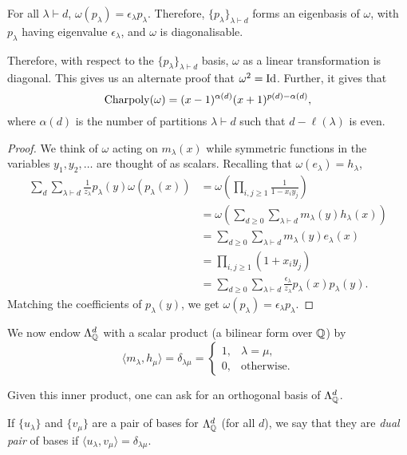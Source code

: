 	\begin{ftheo}
		\label{theo: p eigenbasis of omega}
		For all $\lambda \vdash d$, $\omega(p_\lambda) = \epsilon_\lambda p_\lambda$. Therefore, $\{p_\lambda\}_{\lambda \vdash d}$ forms an eigenbasis of $\omega$, with $p_\lambda$ having eigenvalue $\epsilon_\lambda$, and $\omega$ is diagonalisable.
	\end{ftheo}
	Therefore, with respect to the $\{p_\lambda\}_{\lambda \vdash d}$ basis, $\omega$ as a linear transformation is diagonal. This gives us an alternate proof that $\omega^2 = \operatorname{Id}$. Further, it gives that
	\[ \operatorname{Charpoly}(\omega) = (x-1)^{\alpha(d)} (x+1)^{p(d) - \alpha(d)}, \]
	where $\alpha(d)$ is the number of partitions $\lambda \vdash d$ such that $d - \ell(\lambda)$ is even.
	\begin{proof}
		We think of $\omega$ acting on $m_\lambda(x)$ while symmetric functions in the variables $y_1,y_2,\ldots$ are thought of as scalars. Recalling that $\omega(e_\lambda) = h_\lambda$,
		\begin{align*}
			\sum_{d}\sum_{\lambda \vdash d} \frac{1}{z_\lambda} p_\lambda(y) \omega(p_\lambda(x)) &= \omega \left( \prod_{i,j \ge 1} \frac{1}{1-x_iy_j} \right) \\
				&= \omega \left( \sum_{d \ge 0} \sum_{\lambda \vdash d} m_\lambda(y) h_\lambda(x) \right) \\
				&= \sum_{d \ge 0} \sum_{\lambda \vdash d} m_\lambda(y) e_\lambda(x) \\
				&= \prod_{i,j \ge 1} (1+x_iy_j) \\
				&= \sum_{d \ge 0} \sum_{\lambda \vdash d} \frac{\epsilon_\lambda}{z_\lambda} p_\lambda(x) p_\lambda(y).
		\end{align*}
		Matching the coefficients of $p_\lambda(y)$, we get $\omega(p_\lambda) = \epsilon_\lambda p_\lambda$.
	\end{proof}

	We now endow $\Lambda_{\mathbb{Q}}^d$ with a scalar product (a bilinear form over $\mathbb{Q}$) by
	\[ \langle m_\lambda , h_\mu \rangle = \delta_{\lambda\mu} = \begin{cases} 1, & \lambda = \mu, \\ 0, & \text{otherwise.} \end{cases} \]

	Given this inner product, one can ask for an orthogonal basis of $\Lambda_{\mathbb{Q}}^d$.

	\begin{fdef}
		If $\{u_\lambda\}$ and $\{v_\mu\}$ are a pair of bases for $\Lambda_{\mathbb{Q}}^d$ (for all $d$), we say that they are \emph{dual pair} of bases if $\langle u_\lambda , v_\mu \rangle = \delta_{\lambda\mu}$.
	\end{fdef}

